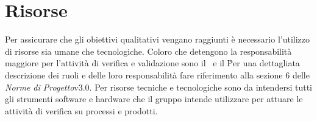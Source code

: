 \section{Risorse}

Per assicurare che gli obiettivi qualitativi vengano raggiunti è necessario l'utilizzo di risorse sia umane che tecnologiche. Coloro che detengono la responsabilità maggiore per l'attività di verifica e validazione sono il \ruoloResponsabile\ e il \ruoloVerificatore\. Per una dettagliata descrizione dei ruoli e delle loro responsabilità fare riferimento alla sezione 6 delle \textit{Norme di Progetto}v3.0. Per risorse tecniche e tecnologiche sono da intendersi tutti gli strumenti software e hardware che il gruppo intende utilizzare per attuare le attività di verifica su processi e prodotti.